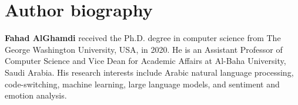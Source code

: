 \section*{Author biography}
\begingroup\small
\textbf{Fahad AlGhamdi} received the Ph.D. degree in computer science from The George Washington University, USA, in 2020. He is an Assistant Professor of Computer Science and Vice Dean for Academic Affairs at Al-Baha University, Saudi Arabia. His research interests include Arabic natural language processing, code-switching, machine learning, large language models, and sentiment and emotion analysis.\EOD\par\endgroup
